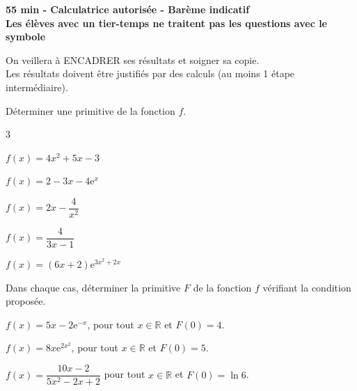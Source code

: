 \documentclass[11pt,a4paper]{article}  %
\begin{document}
	\graphicspath{{images/}}
	
	\begin{center}
		
	\end{center}
	\begin{center}\textbf{55 min - Calculatrice autorisée - Barème indicatif}\\
		\textbf{Les élèves avec un tier-temps ne traitent pas les questions avec  le symbole }
	\end{center}
	
	\begin{center}
		On veillera à ENCADRER ses résultats et soigner sa copie.\\
		Les résultats doivent être justifiés par des calculs (au moins 1 étape intermédiaire).
	\end{center}
	
\vspace*{-0.5cm}
Déterminer une primitive de la fonction $f$.

\begin{multicols}{3}
	\begin{enumMet}
		\item {} $f(x)=4 x^2+5 x-3$
		\item $f(x)=2-3x-4 \mathrm{e}^x$
		\item $f(x)=2 x-\dfrac{4}{x^2}$
		\item $f(x)=\dfrac{4}{3 x-1}$
		\item $f(x)=(6x+2) \mathrm{e}^{3x^2+2 x}$
	\end{enumMet}
\end{multicols}

\vspace*{-0.5cm}

Dans chaque cas, déterminer la primitive $F$ de la fonction $f$ vérifiant la condition proposée.
	\begin{enumMet}
		\item $f(x)=5 x-2\mathrm{e}^{-x}$, pour tout $x \in \mathbb{R}$ et $F(0)=4$.
		\item $f(x)=8x \mathrm{e}^{2x^2}$, pour tout $x \in \mathbb{R}$ et $F(0)=5$.
		\item $f(x)=\dfrac{10x-2}{5 x^2-2x+2}$ pour tout $x \in \mathbb{R}$ et $F(0)=\ln 6$.
	\end{enumMet}
\end{document}
